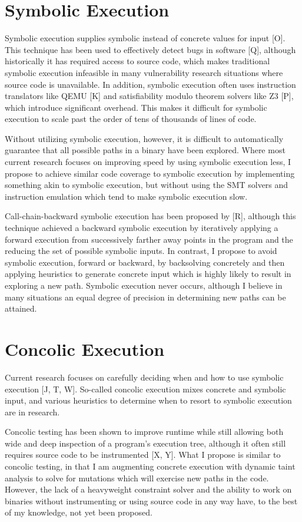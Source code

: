 \documentclass[11pt,expanded,copyright]{fsuthesis}
\begin{document}
\section{Symbolic Execution}

Symbolic execution supplies symbolic instead of concrete values for input [O]. This technique has been used to effectively detect bugs in software [Q], although historically it has required access to source code, which makes traditional symbolic execution infeasible in many vulnerability research situations where source code is unavailable. In addition, symbolic execution often uses instruction translators like QEMU [K] and satisfiability modulo theorem solvers like Z3 [P], which introduce significant overhead. This makes it difficult for symbolic execution to scale past the order of tens of thousands of lines of code. 

Without utilizing symbolic execution, however, it is difficult to automatically guarantee that all possible paths in a binary have been explored. Where most current research focuses on improving speed by using symbolic execution less, I propose to achieve similar code coverage to symbolic execution by implementing something akin to symbolic execution, but without using the SMT solvers and instruction emulation which tend to make symbolic execution slow.

Call-chain-backward symbolic execution has been proposed by [R], although this technique achieved a backward symbolic execution by iteratively applying a forward execution from successively farther away points in the program and the reducing the set of possible symbolic inputs. In contrast, I propose to avoid symbolic execution, forward or backward, by backsolving concretely and then applying heuristics to generate concrete input which is highly likely to result in exploring a new path. Symbolic execution never occurs, although I believe in many situations an equal degree of precision in determining new paths can be attained.

\section{Concolic Execution}

Current research focuses on carefully deciding when and how to use symbolic execution [J, T, W]. So-called concolic execution mixes concrete and symbolic input, and various heuristics to determine when to resort to symbolic execution are in research.

Concolic testing has been shown to improve runtime while still allowing both wide and deep inspection of a program's execution tree, although it often still requires source code to be instrumented [X, Y]. What I propose is similar to concolic testing, in that I am augmenting concrete execution with dynamic taint analysis to solve for mutations which will exercise new paths in the code. However, the lack of a heavyweight constraint solver and the ability to work on binaries without instrumenting or using source code in any way have, to the best of my knowledge, not yet been proposed.
\end{document}
